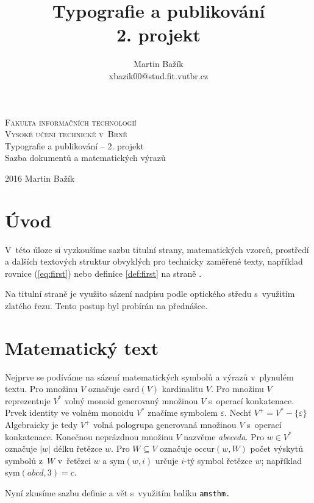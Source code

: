 \documentclass[a4paper,twocolumn,11pt]{article}
\author{Martin Bažík \\ xbazik00@stud.fit.vutbr.cz}
\title{Typografie a publikování \\ 2. projekt}
\date{}
\theoremstyle{definition}
\theoremstyle{remark}
\begin{document}
	\begin{titlepage}
		\begin{center}
			\textsc{{\Huge Fakulta informačních technologií\\
				Vysoké učení technické v~Brně}}
			\\{\LARGE Typografie a publikování -- 2. projekt\\
				Sazba dokumentů a matematických výrazů}
		\end{center}
		{\Large 2016 \hfill Martin Bažík}	
	\end{titlepage}
	\newpage

	\section*{Úvod}
	V~této úloze si vyzkoušíme sazbu titulní strany, matematických vzorců, prostředí a dalších textových struktur obvyklých pro technicky zaměřené texty, například rovnice (\ref{eq:first})  nebo definice \ref{def:first} na straně \pageref{def:first}.
	
	Na titulní straně je využito sázení nadpisu podle optického středu s~využitím zlatého řezu. Tento postup byl probírán na přednášce.
	
	\section{Matematický text}
	Nejprve se podíváme na sázení matematických symbolů a výrazů v~plynulém textu. Pro množinu $V$ označuje $\mbox{card}(V)$ kardinalitu $V$.
	Pro množinu $V$ reprezentuje $V^*$ volný monoid generovaný množinou $V$ s~operací konkatenace.
	Prvek identity ve volném monoidu $V^*$ značíme symbolem $\varepsilon$.
	Nechť $V^+=V^*-\{\varepsilon\}$ Algebraicky je tedy $V^+$ volná pologrupa generovaná množinou $V$ s~operací konkatenace.
	Konečnou neprázdnou množinu $V$ nazvěme \emph{abeceda}.
	Pro $w\in V^*$ označuje $|w|$ délku řetězce $w$. Pro $W\subseteq V$ označuje $\mbox{occur}(w,W)$ počet výskytů symbolů z~$W$ v~řetězci $w$ a $\mbox{sym}(w,i)$ určuje $i$-tý symbol řetězce $w$; například sym$(abcd,3) = c$.
	
	Nyní zkusíme sazbu definic a vět s~využitím balíku \tt amsthm\normalfont.
\end{document}
